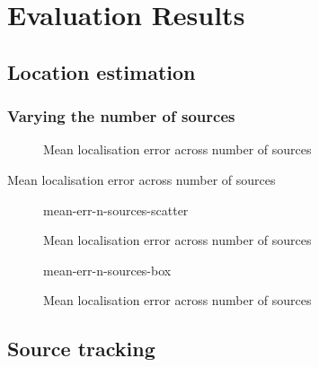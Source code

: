 \chapter{Evaluation Results}
\label{chap:results}

\section{Location estimation}
\subsection*{Varying the number of sources}

\begin{figure}[H]
	\centering
		
%		
	\caption{Mean localisation error across number of sources}
\end{figure}

\begin{table}[H]
	\centering
	
	\caption{Mean localisation error across number of sources}
\end{table}


\begin{figure}[H]
	\centering
	{mean-err-n-sources-scatter}
	\caption{Mean localisation error across number of sources}
\end{figure}

\begin{figure}[H]
	\centering
	{mean-err-n-sources-box}
	\caption{Mean localisation error across number of sources}
\end{figure}






\section{Source tracking}